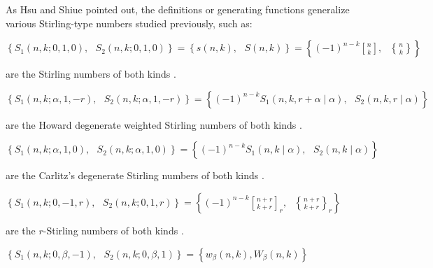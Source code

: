 \documentclass{article}%
\begin{document}
As Hsu and Shiue pointed out, the definitions or generating functions
generalize various Stirling-type numbers studied previously, such as:

\begin{description}
\item[i.] $\left\{  S_{1}\left(  n,k;0,1,0\right)  ,\text{ }S_{2}\left(
n,k;0,1,0\right)  \right\}  =\left\{  s\left(  n,k\right)  ,\text{ }S\left(
n,k\right)  \right\}  =\left\{  \left(  -1\right)  ^{n-k}%
\genfrac{[}{]}{0pt}{}{n}{k}%
,\text{ }%
\genfrac{\{}{\}}{0pt}{}{n}{k}%
\right\}  $

\item are the Stirling numbers of both kinds \cite[Chapter 6]{Graham}.

\item[ii.] $\left\{  S_{1}\left(  n,k;\alpha,1,-r\right)  ,\text{ }%
S_{2}\left(  n,k;\alpha,1,-r\right)  \right\}  =\left\{  \left(  -1\right)
^{n-k}S_{1}\left(  n,k,r+\alpha\mid\alpha\right)  ,\text{ }S_{2}\left(
n,k,r\mid\alpha\right)  \right\}  $

\item are the Howard degenerate weighted Stirling numbers of both kinds
\cite{Howard}.

\item[iii.] $\left\{  S_{1}\left(  n,k;\alpha,1,0\right)  ,\text{ }%
S_{2}\left(  n,k;\alpha,1,0\right)  \right\}  =\left\{  \left(  -1\right)
^{n-k}S_{1}\left(  n,k\mid\alpha\right)  ,\text{ }S_{2}\left(  n,k\mid
\alpha\right)  \right\}  $

\item are the Carlitz's degenerate Stirling numbers of both kinds
\cite{Carlitz}.

\item[iv.] $\left\{  S_{1}\left(  n,k;0,-1,r\right)  ,\text{ }S_{2}\left(
n,k;0,1,r\right)  \right\}  =\left\{  \left(  -1\right)  ^{n-k}%
\genfrac{[}{]}{0pt}{}{n+r}{k+r}%
_{r},\text{ }%
\genfrac{\{}{\}}{0pt}{}{n+r}{k+r}%
_{r}\right\}  $

\item are the $r$-Stirling numbers of both kinds \cite{Broder}.

\item[v.] $\left\{  S_{1}\left(  n,k;0,\beta,-1\right)  ,\text{ }S_{2}\left(
n,k;0,\beta,1\right)  \right\}  =\left\{  w_{\beta}\left(  n,k\right)  ,\text{
}W_{\beta}\left(  n,k\right)  \right\}  $


\end{description}
\end{document}
